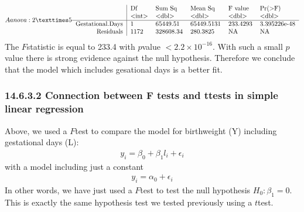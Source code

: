 \documentclass[letterpaper,10pt,english]{jupyterBook}
\begin{document}
\begin{sphinxVerbatim}[commandchars=\\\{\}]
\end{sphinxVerbatim}
\begin{equation*}
\begin{split}A anova: 2 × 5
\begin{tabular}{r|lllll}
  & Df & Sum Sq & Mean Sq & F value & Pr(>F)\\
  & <int> & <dbl> & <dbl> & <dbl> & <dbl>\\
\hline
	Gestational.Days &    1 &  65449.51 & 65449.5131 & 233.4293 & 3.395226e-48\\
	Residuals & 1172 & 328608.34 &   280.3825 &       NA &           NA\\
\end{tabular}\end{split}
\end{equation*}
\sphinxAtStartPar
The \(F\)\sphinxhyphen{}statistic is equal to 233.4 with \(p\)\sphinxhyphen{}value \(<2.2\times10^{-16}\). With such a small \(p\)\sphinxhyphen{}value there is strong evidence against the null hypothesis. Therefore we conclude that the model which includes gesational days is a better fit.


\subsubsection{14.6.3.2 Connection between F tests and t\sphinxhyphen{}tests in simple linear regression}
\label{\detokenize{14.g. Linear Regression III:connection-between-f-tests-and-t-tests-in-simple-linear-regression}}
\sphinxAtStartPar
Above, we used a \(F\)\sphinxhyphen{}test to compare the model for birthweight (Y) including gestational days (L):
\begin{equation*}
\begin{split}
y_i = \beta_0  + \beta_1 l_i + \epsilon_i
\end{split}
\end{equation*}
\sphinxAtStartPar
with a model including just a constant
\begin{equation*}
\begin{split}
y_i = \alpha_0  + \epsilon_i
\end{split}
\end{equation*}
\sphinxAtStartPar
In other words, we have just used a \(F\)\sphinxhyphen{}test to test the null hypothesis \(H_0: \beta_1 = 0\). This is exactly the same hypothesis test we tested previously using a \(t\)\sphinxhyphen{}test.
\end{document}
